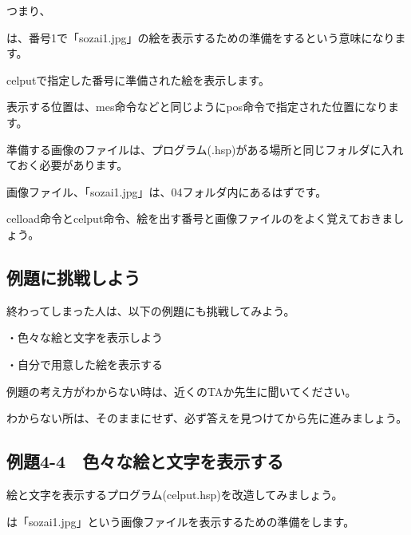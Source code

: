 つまり、


\begin{description}
    \item {}
\end{description}

は、番号1で「sozai1.jpg」の絵を表示するための準備をするという意味になります。

celputで指定した番号に準備された絵を表示します。

表示する位置は、mes命令などと同じようにpos命令で指定された位置になります。

準備する画像のファイルは、プログラム(.hsp)がある場所と同じフォルダに入れておく必要があります。

画像ファイル、「sozai1.jpg」は、04フォルダ内にあるはずです。


celload命令とcelput命令、絵を出す番号と画像ファイルのをよく覚えておきましょう。

\newpage
\subsection{例題に挑戦しよう}


終わってしまった人は、以下の例題にも挑戦してみよう。


・色々な絵と文字を表示しよう

・自分で用意した絵を表示する

例題の考え方がわからない時は、近くのTAか先生に聞いてください。

わからない所は、そのままにせず、必ず答えを見つけてから先に進みましょう。

\newpage
\subsection{例題4-4　色々な絵と文字を表示する}


\begin{description}
    \item {}
\end{description}

絵と文字を表示するプログラム(celput.hsp)を改造してみましょう。

\begin{description}
    \item {}
\end{description}


は「sozai1.jpg」という画像ファイルを表示するための準備をします。

